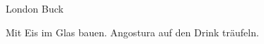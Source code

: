 \begin{recipe}{London Buck}{}{}

  \freeform{}\textit{}


  Mit Eis im Glas bauen. Angostura auf den Drink träufeln.

  \freeform{}\hrulefill{}

\end{recipe}
